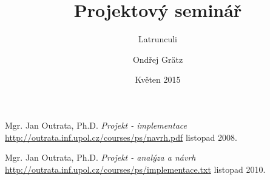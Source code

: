 \documentclass{article}
\title{Projektový seminář}
\subtitle{Latrunculi}
\author{Ondřej Grätz}
\date{Květen 2015}
\begin{document}
\maketitle

\newpage

\begin{thebibliography}{99}

	
 Mgr. Jan Outrata, Ph.D. \emph{Projekt - implementace}
 \url{http://outrata.inf.upol.cz/courses/ps/navrh.pdf}
			listopad 2008.

	
 Mgr. Jan Outrata, Ph.D. \emph{Projekt - analýza a návrh}
 \url{http://outrata.inf.upol.cz/courses/ps/implementace.txt}
			listopad 2010.

\end{thebibliography} 
\end{document}
